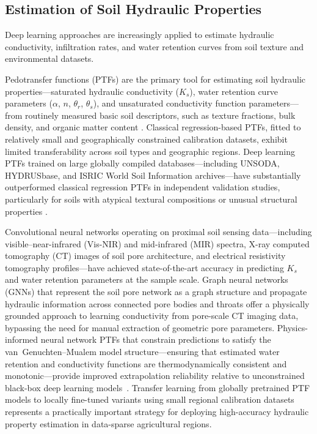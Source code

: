 \documentclass[land,review,accept,pdftex,oneauthor]{Definitions/mdpi}
\begin{document}
\subsection{Estimation of Soil Hydraulic Properties}\label{sec5.3}

Deep learning approaches {are increasingly applied to estimate} hydraulic conductivity, infiltration rates, and water retention curves from soil texture and environmental datasets.

Pedotransfer functions (PTFs) are the primary tool for estimating soil hydraulic properties---saturated hydraulic conductivity ($K_s$), water retention curve parameters ($\alpha$, $n$, $\theta_r$, $\theta_s$), and unsaturated conductivity function parameters---from routinely measured basic soil descriptors, such as texture fractions, bulk density, and organic matter content \citep{wosten2001pedotransfer}. Classical regression-based PTFs, fitted to relatively small and geographically constrained calibration datasets, exhibit limited transferability across soil types and geographic regions. Deep learning PTFs trained on large globally compiled databases---including UNSODA, HYDRUSbase, and ISRIC World Soil Information archives---have substantially outperformed classical regression PTFs in independent validation studies, particularly for soils with atypical textural compositions or unusual structural properties \citep{zhang2018deep}.

Convolutional neural networks operating on proximal soil sensing data---including visible--near-infrared (Vis-NIR) and mid-infrared (MIR) spectra, X-ray computed tomography (CT) images of soil pore architecture, and electrical resistivity tomography profiles---have achieved state-of-the-art accuracy in predicting $K_s$ and water retention parameters at the sample scale. Graph neural networks (GNNs) that represent the soil pore network as a graph structure and propagate hydraulic information across connected pore bodies and throats offer a physically grounded approach to learning conductivity from pore-scale CT imaging data, bypassing the need for manual extraction of geometric pore parameters. Physics-informed neural network PTFs that constrain predictions to satisfy the van~Genuchten--Mualem model structure---ensuring that estimated water retention and conductivity functions are thermodynamically consistent and monotonic---provide improved extrapolation reliability relative to unconstrained black-box deep learning models~\citep{Karniadakis2021}. Transfer learning from globally pretrained PTF models to locally fine-tuned variants using small regional calibration datasets represents a practically important strategy for deploying high-accuracy hydraulic property estimation in data-sparse agricultural regions.
\end{document}
